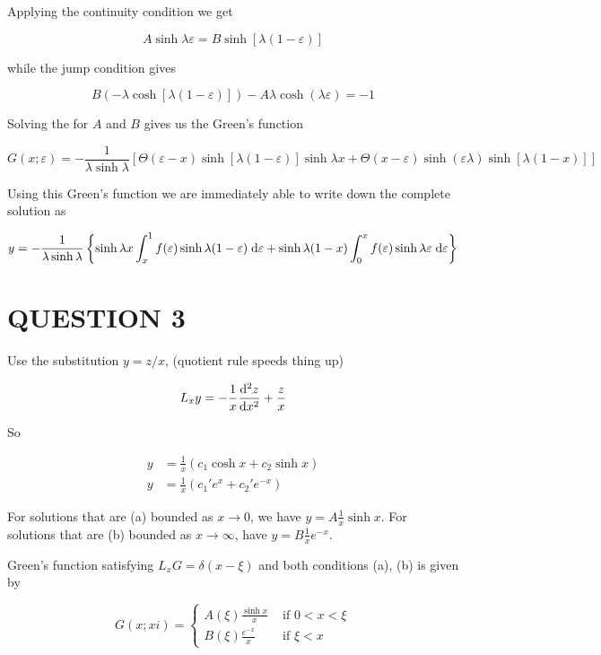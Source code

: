 \documentclass[a4paper]{article}
\begin{document}
Applying the continuity condition we get

\[ A \sinh \lambda \varepsilon = B \sinh[\lambda(1-\varepsilon)] \]
 
while the jump condition gives 

\[ B(- \lambda \cosh[\lambda(1-\varepsilon)] ) - A \lambda \cosh( \lambda \varepsilon) = -1 \]

Solving the for $ A $ and $ B $ gives us the Green's function

\[ G(x;\varepsilon) = - \frac{1}{ \lambda \sinh \lambda} \left[  \Theta( \varepsilon - x) \sinh[  \lambda(1 - \varepsilon) ] \sinh \lambda x  + \Theta(x - \varepsilon) \sinh(\varepsilon \lambda) \sinh[\lambda(1-x)]  \right]   \]

Using this Green's function we are immediately able to write down the complete solution as

\[ y = - \frac{1}{\lambda \sinh \lambda} \left\{  \sinh \lambda x \int_{x}^{1}f(\varepsilon) \sinh \lambda(1-\varepsilon) \; \mathrm{d} \varepsilon + \sinh \lambda(1-x)\int_{0}^{x} f(\varepsilon) \sinh \lambda \varepsilon \; \mathrm{d} \varepsilon \right\}  \]


\section{QUESTION 3}

Use the substitution $ y = z / x $, (quotient rule speeds thing up)

\begin{align*}
L_{x}y = - \frac{1}{x} \frac{\mathrm{d}^{2} z}{\mathrm{d} x^{2}} + \frac{z}{x} 
\end{align*}

So

\begin{align*}
y & = \frac{1}{x} \left(  c_{1} \cosh x + c_{2} \sinh x \right)  \\
y & = \frac{1}{x} \left( c_{1}'e^{x} + c_{2}'e^{-x} \right) 
\end{align*} 

For solutions that are (a) bounded as $ x \to 0 $, we have $ y = A \frac{1}{x} \sinh x $. For solutions that are (b) bounded as $ x \to \infty $, have $ y = B \frac{1}{x} e^{-x} $. 

Green's function satisfying $ L_{x} G = \delta(x - \xi) $ and both conditions (a), (b) is given by 

\[ G(x;xi) =  \begin{cases} A(\xi) \frac{\sinh x}{x}  & \text{ if } 0 < x < \xi \\ B(\xi) \frac{e^{-x} }{x}  & \text{ if } \xi < x \end{cases}   \]
\end{document}
